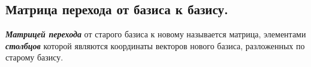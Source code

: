 \subsection{
    Матрица перехода от базиса к базису.
}

\begin{definition}
    \textit{\textbf{Матрицей перехода}} от старого базиса к новому называется матрица, элементами \textit{\textbf{столбцов}} которой являются координаты векторов нового базиса, разложенных по старому базису.
    \label{fig:definition_17_1}
\end{definition}
